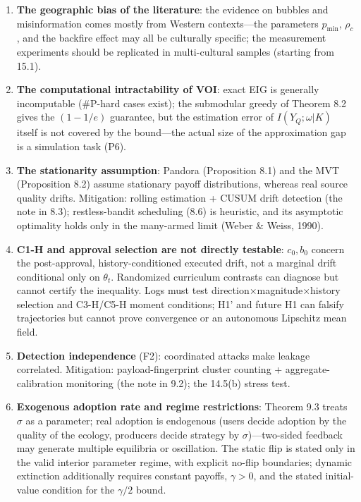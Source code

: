 \documentclass[
  11pt]{article}
\begin{document}
\begin{enumerate}
\item
  \textbf{The geographic bias of the literature}: the evidence on
  bubbles and misinformation comes mostly from Western contexts---the
  parameters \(p_{\min}\), \(\rho_c\), and the backfire effect may all
  be culturally specific; the measurement experiments should be
  replicated in multi-cultural samples (starting from 15.1).
\item
  \textbf{The computational intractability of VOI}: exact EIG is
  generally incomputable (\#P-hard cases exist); the submodular greedy
  of Theorem 8.2 gives the \((1-1/e)\) guarantee, but the estimation
  error of \(I(Y_Q;\omega|K)\) itself is not covered by the bound---the
  actual size of the approximation gap is a simulation task (P6).
\item
  \textbf{The stationarity assumption}: Pandora (Proposition 8.1) and
  the MVT (Proposition 8.2) assume stationary payoff distributions,
  whereas real source quality drifts. Mitigation: rolling estimation +
  CUSUM drift detection (the note in 8.3); restless-bandit scheduling
  (8.6) is heuristic, and its asymptotic optimality holds only in the
  many-armed limit (Weber \& Weiss, 1990).
\item
  \textbf{C1-H and approval selection are not directly testable}:
  \(c_0,b_0\) concern the post-approval, history-conditioned executed
  drift, not a marginal drift conditional only on \(\theta_t\).
  Randomized curriculum contrasts can diagnose but cannot certify the
  inequality. Logs must test direction×magnitude×history selection and
  C3-H/C5-H moment conditions; H1' and future H1 can falsify
  trajectories but cannot prove convergence or an autonomous Lipschitz
  mean field.
\item
  \textbf{Detection independence} (F2): coordinated attacks make leakage
  correlated. Mitigation: payload-fingerprint cluster counting +
  aggregate-calibration monitoring (the note in 9.2); the 14.5(b) stress
  test.
\item
  \textbf{Exogenous adoption rate and regime restrictions}: Theorem 9.3
  treats \(\sigma\) as a parameter; real adoption is endogenous (users
  decide adoption by the quality of the ecology, producers decide
  strategy by \(\sigma\))---two-sided feedback may generate multiple
  equilibria or oscillation. The static flip is stated only in the valid
  interior parameter regime, with explicit no-flip boundaries; dynamic
  extinction additionally requires constant payoffs, \(\gamma>0\), and
  the stated initial-value condition for the \(\gamma/2\) bound.

\end{enumerate}
\end{document}
